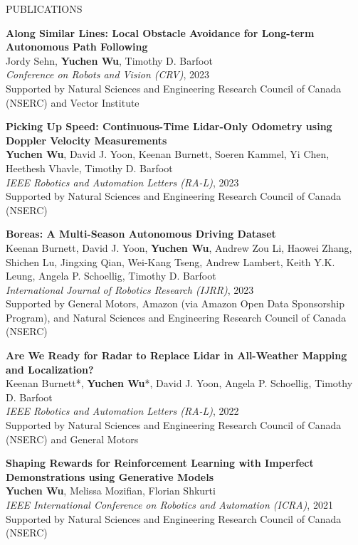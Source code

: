 \documentclass{cv}
\begin{document}
\begin{rSection}{PUBLICATIONS}
  \item \textbf{Along Similar Lines: Local Obstacle Avoidance for Long-term Autonomous Path Following}\\
  Jordy Sehn, \textbf{Yuchen Wu}, Timothy D. Barfoot\\
  \textit{Conference on Robots and Vision (CRV)}, 2023\\
  Supported by Natural Sciences and Engineering Research Council of Canada (NSERC) and Vector Institute

  \item \textbf{Picking Up Speed: Continuous-Time Lidar-Only Odometry using Doppler Velocity Measurements}\\
  \textbf{Yuchen Wu}, David J. Yoon, Keenan Burnett, Soeren Kammel, Yi Chen, Heethesh Vhavle, Timothy D. Barfoot\\
  \textit{IEEE Robotics and Automation Letters (RA-L)}, 2023\\
  Supported by Natural Sciences and Engineering Research Council of Canada (NSERC)

  \item \textbf{Boreas: A Multi-Season Autonomous Driving Dataset}\\
  Keenan Burnett, David J. Yoon, \textbf{Yuchen Wu}, Andrew Zou Li, Haowei Zhang, Shichen Lu, Jingxing Qian, Wei-Kang Tseng, Andrew Lambert, Keith Y.K. Leung, Angela P. Schoellig, Timothy D. Barfoot\\
  \textit{International Journal of Robotics Research (IJRR)}, 2023\\
  Supported by General Motors, Amazon (via Amazon Open Data Sponsorship Program), and Natural Sciences and Engineering Research Council of Canada (NSERC)
  
  \item \textbf{Are We Ready for Radar to Replace Lidar in All-Weather Mapping and Localization?}\\
  Keenan Burnett*, \textbf{Yuchen Wu}*, David J. Yoon, Angela P. Schoellig, Timothy D. Barfoot\\
  \textit{IEEE Robotics and Automation Letters (RA-L)}, 2022\\
  Supported by Natural Sciences and Engineering Research Council of Canada (NSERC) and General Motors

  \item \textbf{Shaping Rewards for Reinforcement Learning with Imperfect Demonstrations using Generative Models}\\
  \textbf{Yuchen Wu}, Melissa Mozifian, Florian Shkurti\\
  \textit{IEEE International Conference on Robotics and Automation (ICRA)}, 2021\\
  Supported by Natural Sciences and Engineering Research Council of Canada (NSERC)
\end{rSection}
\end{document}
